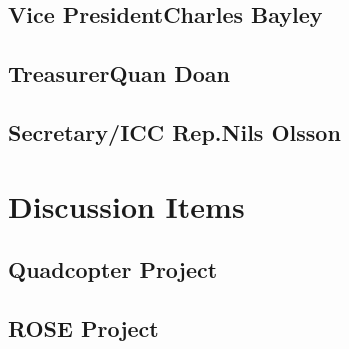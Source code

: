 \documentclass{article}
\begin{document}
\subsection{Vice President\dotfill Charles Bayley}
\subsection{Treasurer\dotfill Quan Doan}
\subsection{Secretary/ICC Rep.\dotfill Nils Olsson}


\section{Discussion Items}
\subsection{Quadcopter Project}
\subsection{ROSE Project}
\end{document}
